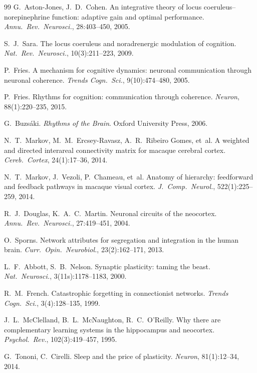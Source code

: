 \documentclass[11pt,a4paper]{article}
\begin{document}
\begin{thebibliography}{99}
G.~Aston-Jones, J.~D.~Cohen.
An integrative theory of locus coeruleus--norepinephrine function:
adaptive gain and optimal performance.
\emph{Annu.\ Rev.\ Neurosci.}, 28:403--450, 2005.

S.~J.~Sara.
The locus coeruleus and noradrenergic modulation of cognition.
\emph{Nat.\ Rev.\ Neurosci.}, 10(3):211--223, 2009.

P.~Fries.
A mechanism for cognitive dynamics: neuronal communication through
neuronal coherence.
\emph{Trends Cogn.\ Sci.}, 9(10):474--480, 2005.

P.~Fries.
Rhythms for cognition: communication through coherence.
\emph{Neuron}, 88(1):220--235, 2015.

G.~Buzs\'aki.
\emph{Rhythms of the Brain}.
Oxford University Press, 2006.

N.~T.~Markov, M.~M.~Ercsey-Ravasz, A.~R.~Ribeiro Gomes, et~al.
A weighted and directed interareal connectivity matrix for macaque
cerebral cortex.
\emph{Cereb.\ Cortex}, 24(1):17--36, 2014.

N.~T.~Markov, J.~Vezoli, P.~Chameau, et~al.
Anatomy of hierarchy: feedforward and feedback pathways in macaque
visual cortex.
\emph{J.\ Comp.\ Neurol.}, 522(1):225--259, 2014.

R.~J.~Douglas, K.~A.~C.~Martin.
Neuronal circuits of the neocortex.
\emph{Annu.\ Rev.\ Neurosci.}, 27:419--451, 2004.

O.~Sporns.
Network attributes for segregation and integration in the human
brain.
\emph{Curr.\ Opin.\ Neurobiol.}, 23(2):162--171, 2013.

L.~F.~Abbott, S.~B.~Nelson.
Synaptic plasticity: taming the beast.
\emph{Nat.\ Neurosci.}, 3(11s):1178--1183, 2000.

R.~M.~French.
Catastrophic forgetting in connectionist networks.
\emph{Trends Cogn.\ Sci.}, 3(4):128--135, 1999.

J.~L.~McClelland, B.~L.~McNaughton, R.~C.~O'Reilly.
Why there are complementary learning systems in the hippocampus and
neocortex.
\emph{Psychol.\ Rev.}, 102(3):419--457, 1995.

G.~Tononi, C.~Cirelli.
Sleep and the price of plasticity.
\emph{Neuron}, 81(1):12--34, 2014.


\end{thebibliography}
\end{document}
